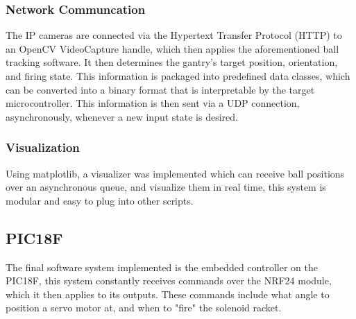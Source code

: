 \subsubsection{Network Communcation}
The IP cameras are connected via the Hypertext Transfer Protocol (HTTP) to an OpenCV VideoCapture handle, which then applies the aforementioned ball tracking software. It then determines the gantry's target position, orientation, and firing state. This information is packaged into predefined data classes, which can be converted into a binary format that is interpretable by the target microcontroller. This information is then sent via a UDP connection, asynchronously, whenever a new input state is desired.

\subsubsection{Visualization}
Using matplotlib, a visualizer was implemented which can receive ball positions over an asynchronous queue, and visualize them in real time, this system is modular and easy to plug into other scripts.

\subsection{PIC18F}
The final software system implemented is the embedded controller on the PIC18F, this system constantly receives commands over the NRF24 module, which it then applies to its outputs. These commands include what angle to position a servo motor at, and when to "fire" the solenoid racket.


